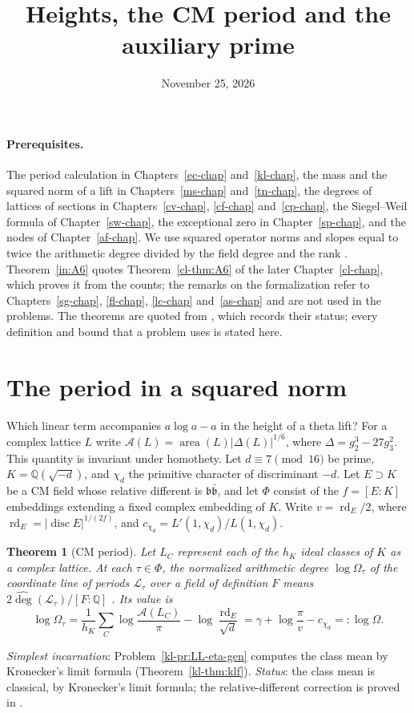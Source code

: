 \documentclass[reqno]{amsart}
\title{Heights, the CM period and the auxiliary prime}
\author{}
\date{November 25, 2026}
\newcounter{chap}
\theoremstyle{definition}
\theoremstyle{plain}
\newtheorem{theorem}{Theorem}[section]
\newcommand{\rd}{\operatorname{rd}}
\newcommand{\Q}{\mathbb{Q}}
\begin{document}
\maketitle
{}\label{chap}

\paragraph{Prerequisites.}
The period calculation in Chapters~\ref{ec-chap} and~\ref{kl-chap},
the mass and the squared norm of a lift in Chapters~\ref{ms-chap}
and~\ref{tn-chap}, the degrees of lattices of sections in
Chapters~\ref{cv-chap}, \ref{cf-chap} and~\ref{cp-chap}, the
Siegel--Weil formula of Chapter~\ref{sw-chap}, the exceptional zero in
Chapter~\ref{sp-chap}, and the nodes of Chapter~\ref{af-chap}.
We use squared operator norms and slopes equal to twice the arithmetic
degree divided by the field degree and the rank \cite[\S15.1]{Adr}.
Theorem~\ref{in:A6} quotes Theorem~\ref{cl-thm:A6} of the later
Chapter~\ref{cl-chap}, which proves it from the counts; the remarks on the
formalization refer to Chapters~\ref{sg-chap}, \ref{fl-chap}, \ref{lc-chap}
and~\ref{as-chap} and are not used in the problems.
The theorems are quoted from \cite[\S15]{Adr}, which records their status;
every definition and bound that a problem uses is stated here.

\section{The period in a squared norm}\label{sec:period}

Which linear term accompanies $a\log a-a$ in the height of a theta lift?
For a complex lattice $L$ write $\mathcal A(L)=\operatorname{area}(L)
|\Delta(L)|^{1/6}$, where $\Delta=g_2^3-27g_3^2$.
This quantity is invariant under homothety.  Let $d\equiv7\pmod{16}$
be prime, $K=\Q(\sqrt{-d})$, and $\chi_d$ the primitive character of
discriminant $-d$.  Let $E\supset K$ be a CM field whose relative different
is $\mathfrak b\bar{\mathfrak b}$, and let $\Phi$ consist of the
$f=[E:K]$ embeddings extending a fixed complex embedding of $K$.
Write $v=\rd_E/2$, where $\rd_E=|\operatorname{disc}E|^{1/(2f)}$,
and $c_{\chi_d}=L'(1,\chi_d)/L(1,\chi_d)$.

\begin{theorem}[CM period]\label{in:period}
Let $L_C$ represent each of the $h_K$ ideal classes of $K$ as a complex lattice.
At each $\tau\in\Phi$, the normalized arithmetic degree $\log\Omega_\tau$
of the coordinate line of periods $\mathcal L_\tau$ over a field of definition
$F$ means $2\widehat{\deg}(\mathcal L_\tau)/[F:\Q]$ \cite[Def.~15.5]{Adr}.  Its value is
\[
 \log\Omega_\tau
 =\frac1{h_K}\sum_C\log\frac{\mathcal A(L_C)}{\pi}
       -\log\frac{\rd_E}{\sqrt d}
 =\gamma+\log\frac{\pi}{v}-c_{\chi_d} =:\log\Omega .
\]
\end{theorem}
\noindent\emph{Simplest incarnation}: Problem~\ref{kl-pr:LL-eta-gen} computes the class
mean by Kronecker's limit formula (Theorem~\ref{kl-thm:klf}).
\emph{Status}: the class mean is classical, by Kronecker's limit formula;
the relative-different correction is proved in \cite[Props.~15.3 and~15.6]{Adr}.
\end{document}
